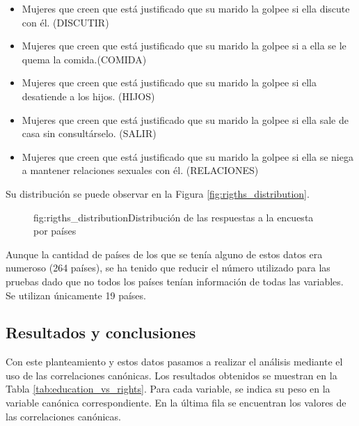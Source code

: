\documentclass[tfg,cienciasbased,lot,lof,covers,final,overleaf,nocopyright]{tfgtfmthesisuam}
\begin{document}
\begin{itemize}
    \item Mujeres que creen que está justificado que su marido la golpee si ella discute con él. (DISCUTIR)
    \item Mujeres que creen que está justificado que su marido la golpee si a ella se le quema la comida.(COMIDA)
    \item Mujeres que creen que está justificado que su marido la golpee si ella desatiende a los hijos. (HIJOS)
    \item Mujeres que creen que está justificado que su marido la golpee si ella sale de casa sin consultárselo. (SALIR)
    \item Mujeres que creen que está justificado que su marido la golpee si ella se niega a mantener relaciones sexuales con él. (RELACIONES)
\end{itemize}

Su distribución se puede observar en la Figura \ref{fig:rigths_distribution}.

\begin{figure}[Distribución de las respuestas a la encuesta por países]{fig:rigths_distribution}{Distribución de las respuestas a la encuesta por países}
\end{figure}

Aunque la cantidad de países de los que se tenía alguno de estos datos era numeroso (264 países), se ha tenido que reducir el número utilizado para las pruebas dado que no todos los países tenían información de todas las variables. Se utilizan únicamente 19 países.

\subsection{Resultados y conclusiones}

Con este planteamiento y estos datos pasamos a realizar el análisis mediante el uso de las correlaciones canónicas. Los resultados obtenidos se muestran en la Tabla \ref{tab:education_vs_rights}. Para cada variable, se indica su peso en la variable canónica correspondiente. En la última fila se encuentran los valores de las correlaciones canónicas.
\end{document}
